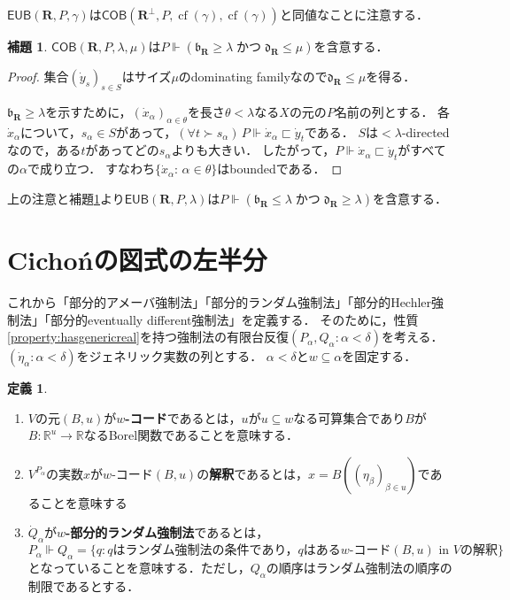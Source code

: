 \documentclass[uplatex,dvipdfmx]{jsarticle}
\newcommand{\R}{\mathbb{R}}
\newcommand\forces{\Vdash}
\newcommand{\AND}{\mathbin{\text{かつ}}}
\newcommand{\frakb}{\mathfrak{b}}
\newcommand{\frakd}{\mathfrak{d}}
\newcommand{\cf}{\operatorname{cf}}
\newcommand{\EUB}{\mathsf{EUB}}
\newcommand{\COB}{\mathsf{COB}}
\newcommand{\relR}{\mathbf{R}}
\renewcommand\subset{\subseteq}
\theoremstyle{definition}
\newtheorem{defi}[thm]{定義}
\newtheorem{lem}[thm]{補題}
\begin{document}
	$\EUB(\relR, P, \gamma)$は$\COB(\relR^\perp, P, \cf(\gamma), \cf(\gamma))$と同値なことに注意する．
	
	\begin{lem}\label{lem:cobimpliesineq}
		$\COB(\relR, P, \lambda, \mu)$は$P \forces (\frakb_\relR \ge \lambda \AND \frakd_\relR \le \mu)$を含意する．
	\end{lem}
	\begin{proof}
		集合$(\dot{y}_s)_{s\in S}$はサイズ$\mu$のdominating familyなので$\mathfrak{d}_\relR\le \mu$を得る．

		$\mathfrak{b}_\relR \ge \lambda$を示すために，$(\dot{x}_\alpha)_{\alpha\in\theta}$を長さ$\theta<\lambda$なる$X$の元の$P$名前の列とする．
		各$\dot{x}_\alpha$について，$s_\alpha\in S$があって，$(\forall t\succ s_\alpha)\, P\forces \dot{x}_\alpha \sqsubset \dot{y}_t$である．
		$S$は${<}\lambda$-directedなので，ある$t$があってどの$s_\alpha$よりも大きい．
		したがって，$P\forces \dot{x}_\alpha \sqsubset \dot{y}_t $がすべての$\alpha$で成り立つ．
		すなわち$\{\dot{x}_\alpha:\, \alpha\in\theta\}$はboundedである．
	\end{proof}

	上の注意と補題\ref{lem:cobimpliesineq}より$\EUB(\relR, P, \lambda)$は$P \forces (\frakb_\relR \le \lambda \AND \frakd_\relR \ge \lambda)$を含意する．
	
	\section{Cichońの図式の左半分}

	これから「部分的アメーバ強制法」「部分的ランダム強制法」「部分的Hechler強制法」「部分的eventually different強制法」を定義する．
	そのために，性質\ref{property:hasgenericreal}を持つ強制法の有限台反復$(P_\alpha, Q_\alpha : \alpha < \delta)$を考える．
	$(\dot{\eta}_\alpha : \alpha < \delta)$をジェネリック実数の列とする．
	$\alpha < \delta$と$w \subset \alpha$を固定する．

	\begin{defi}
		\begin{enumerate}
		\item $V$の元$(B, u)$が\textbf{$w$-コード}であるとは，$u$が$u \subset w$なる可算集合であり$B$が$B \colon \R^u \to \R$なるBorel関数であることを意味する．
		\item $V^{P_\alpha}$の実数$x$が$w$-コード$(B, u)$の\textbf{解釈}であるとは，$x = B((\eta_\beta)_{\beta \in u})$であることを意味する
		\item $\dot{Q}_\alpha$が\textbf{$w$-部分的ランダム強制法}であるとは，
		\[
			P_\alpha \forces Q_\alpha = \{ q : q \text{はランダム強制法の条件であり，}q\text{はある}w\text{-コード}(B, u)\text{ in }V\text{の解釈}\}	
		\]
		となっていることを意味する．ただし，$Q_\alpha$の順序はランダム強制法の順序の制限であるとする．
		\end{enumerate}
	\end{defi}
\end{document}

